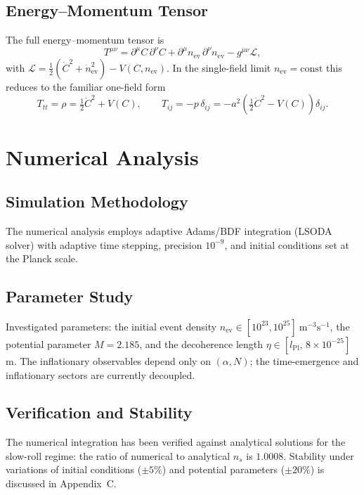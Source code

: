 \documentclass[11pt,a4paper]{article}
\begin{document}
\subsection{Energy--Momentum Tensor}
The full energy--momentum tensor is
\begin{equation}
T^{\mu\nu}=\partial^{\mu}C\,\partial^{\nu}C
+\partial^{\mu}n_{\mathrm{ev}}\,\partial^{\nu}n_{\mathrm{ev}}
-g^{\mu\nu}\mathcal{L},
\end{equation}
with
$\mathcal{L}=\tfrac{1}{2}(\dot{C}^{2}+\dot{n}_{\mathrm{ev}}^{2})
-V(C,n_{\mathrm{ev}})$. In the single-field limit
$n_{\mathrm{ev}}=\mathrm{const}$ this reduces to the familiar
one-field form
\begin{equation}
T_{tt}=\rho=\tfrac{1}{2}\dot{C}^{2}+V(C),\qquad
T_{ij}=-p\,\delta_{ij}
=-a^{2}\!\left(\tfrac{1}{2}\dot{C}^{2}-V(C)\right)\delta_{ij}.
\end{equation}

\section{Numerical Analysis}
\subsection{Simulation Methodology}
The numerical analysis employs adaptive Adams/BDF integration
(LSODA solver) with adaptive time stepping, precision $10^{-9}$,
and initial conditions set at the Planck scale.

\subsection{Parameter Study}
Investigated parameters: the initial event density
$n_{\mathrm{ev}}\in[10^{23},10^{25}]\ \mathrm{m^{-3}s^{-1}}$, the
potential parameter $M=2.185$, and the decoherence length
$\eta\in[l_{\mathrm{Pl}},\,8\times10^{-25}]$ m. The inflationary
observables depend only on $(\alpha,N)$; the time-emergence and
inflationary sectors are currently decoupled.

\subsection{Verification and Stability}
The numerical integration has been verified against analytical
solutions for the slow-roll regime: the ratio of numerical to
analytical $n_{s}$ is $1.0008$. Stability under variations of
initial conditions ($\pm5\%$) and potential parameters ($\pm20\%$)
is discussed in Appendix~C.
\end{document}
